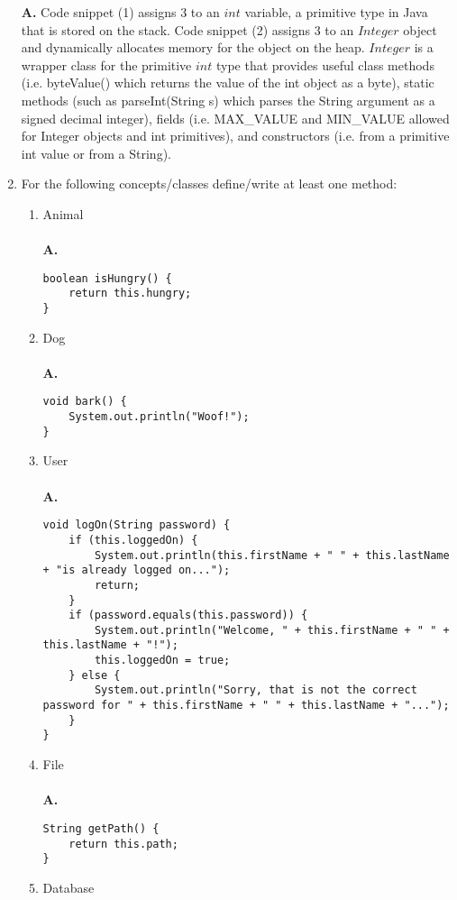 \documentclass[12pt]{article}
\begin{document}
\begin{enumerate}
  \textbf{A.} Code snippet (1) assigns 3 to an $int$ variable, a primitive type in Java that is stored on the stack. Code snippet (2) assigns 3 to an $Integer$ object and dynamically allocates memory for the object on the heap. $Integer$ is a wrapper class for the primitive $int$ type that provides useful class methods (i.e. byteValue() which returns the value of the int object as a byte), static methods (such as parseInt(String s) which parses the String argument as a signed decimal integer), fields (i.e. MAX\_VALUE and MIN\_VALUE allowed for Integer objects and int primitives), and constructors (i.e. from a primitive int value or from a String).
  \\
  \item
  For the following concepts/classes define/write at least one method:
  \begin{enumerate}[label=(\alph*)]
    \item Animal
    \\\\
    \textbf{A.} 
    \begin{lstlisting}
boolean isHungry() {
	return this.hungry;
}
    \end{lstlisting}
    \item Dog
    \\\\
    \textbf{A.} 
    \begin{lstlisting}
void bark() {
	System.out.println("Woof!");
}
    \end{lstlisting}
    \item User
    \\\\
    \textbf{A.} 
    \begin{lstlisting}
void logOn(String password) {
	if (this.loggedOn) {
		System.out.println(this.firstName + " " + this.lastName + "is already logged on...");
		return;
	}
	if (password.equals(this.password)) {
		System.out.println("Welcome, " + this.firstName + " " + this.lastName + "!");
		this.loggedOn = true;
	} else {
		System.out.println("Sorry, that is not the correct password for " + this.firstName + " " + this.lastName + "...");
	}
}
    \end{lstlisting}
    \item File
    \\\\
    \textbf{A.} 
    \begin{lstlisting}
String getPath() {
	return this.path;
}
    \end{lstlisting}
    \item Database

\end{enumerate}
\end{enumerate}
\end{document}
